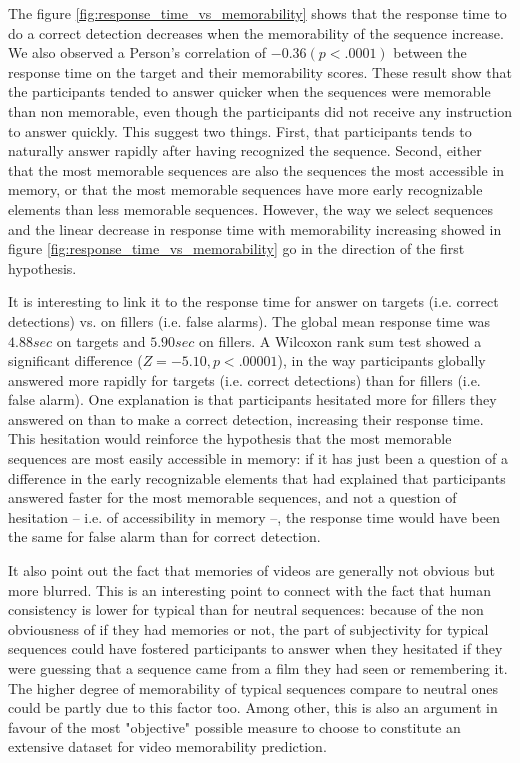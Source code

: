 \documentclass[sigconf]{acmart}
\begin{document}
The figure \ref{fig:response_time_vs_memorability} shows that the response time to do a correct detection decreases when the memorability of the sequence increase.
We also observed a  Person's correlation of $-0.36 (p<.0001)$ between the response time on the target and their memorability scores.
These result show that the participants tended to answer quicker when the sequences were memorable than non memorable, even though the participants did not receive any instruction to answer quickly.
This suggest two things.
First, that participants tends to naturally answer rapidly after having recognized the sequence.
Second, either that the most memorable sequences are also the sequences the most accessible in memory, or that the most memorable sequences have more early recognizable elements than less memorable sequences.
However, the way we select sequences and the linear decrease in response time with memorability increasing showed in figure \ref{fig:response_time_vs_memorability} go in the direction of the first hypothesis.

It is interesting to link it to the response time for answer on targets (i.e. correct detections) vs. on fillers (i.e. false alarms).
The global mean response time was $4.88 sec$ on targets and $5.90 sec$ on fillers.
A Wilcoxon rank sum test showed a significant difference ($Z=-5.10, p<.00001$), in the way participants globally answered more rapidly for targets (i.e. correct detections) than for fillers (i.e. false alarm).
One explanation is that participants hesitated more for fillers they answered on than to make a correct detection, increasing their response time.
This hesitation would reinforce the hypothesis that the most memorable sequences are most easily accessible in memory: if it has just been a question of a difference in the early recognizable elements that had explained that participants answered faster for the most memorable sequences, and not a question of hesitation -- i.e. of accessibility in memory --, the response time would have been the same for false alarm than for correct detection.%

It also point out the fact that memories of videos are generally not obvious but more blurred.
This is an interesting point to connect with the fact that human consistency is lower for typical than for neutral sequences: because of the non obviousness of if they had memories or not, the part of subjectivity for typical sequences could have fostered participants to answer when they hesitated if they were guessing that a sequence came from a film they had seen or remembering it.
The higher degree of memorability of typical sequences compare to neutral ones could be partly due to this factor too.
Among other, this is also an argument in favour of the most "objective" possible measure to choose to constitute an extensive dataset for video memorability prediction.
\end{document}
